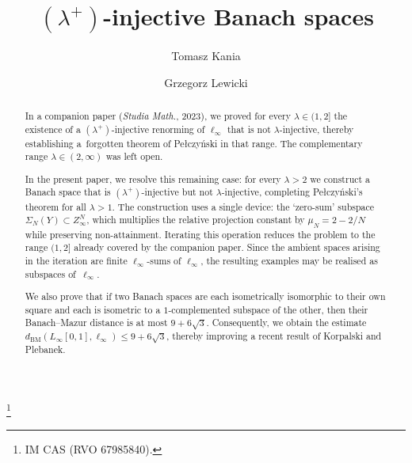 \documentclass[11pt]{amsart}
\renewcommand{\le}{\leqslant}
\theoremstyle{definition}
\theoremstyle{remark}
\theoremstyle{plain}
\numberwithin{equation}{section}
\newcommand{\BM}{\mathrm{BM}}
\newcommand{\dist}{d_{\BM}}
\begin{document}
\title[{$(\lambda^+)$-injective Banach spaces}]%
{$(\lambda^+)$-injective Banach spaces}

\author[T.~Kania]{Tomasz Kania}
\address[T.~Kania]{Mathematical Institute\\Czech Academy of Sciences\\%
\v{Z}itn\'a 25\\115~67 Praha 1\\Czech Republic
and Institute of Mathematics and Computer Science\\%
Jagiellonian University\\{\L}ojasiewicza 6, 30-348 Krak\'{o}w, Poland}
\thanks{IM CAS (RVO 67985840). }

\author[G.~Lewicki]{Grzegorz Lewicki}
\address[G.~Lewicki]{Institute of Mathematics and Computer Science\\%
Jagiellonian University\\{\L}ojasiewicza 6\\30-348 Krak\'{o}w, Poland}


\date{}

\begin{abstract}
In a companion paper (\emph{Studia Math.}, 2023), we proved for every
$\lambda\in(1,2]$ the existence of a $(\lambda^+)$-injective renorming
of $\ell_\infty$ that is not $\lambda$-injective, thereby establishing
a~forgotten theorem of Pe{\l}czy\'nski in that range.
The complementary range $\lambda\in(2,\infty)$ was left open.

In the present paper, we resolve this remaining case: for every
$\lambda>2$ we construct a Banach space that is
$(\lambda^+)$-injective but not $\lambda$-injective, completing
Pe{\l}czy\'nski's theorem for all $\lambda>1$.  The construction uses
a single device: the `zero-sum' subspace
$\Sigma_N(Y)\subset Z_\infty^N$,
which multiplies the relative projection constant by
$\mu_N=2-2/N$ while preserving non-attainment.  Iterating this
operation reduces the problem to the range $(1,2]$ already covered
by the companion paper.  Since the ambient spaces arising in the
iteration are finite $\ell_\infty$-sums of $\ell_\infty$, the
resulting examples may be realised as subspaces of~$\ell_\infty$.

We also prove that if two Banach spaces are each isometrically
isomorphic to their own square and each is isometric to a
$1$-complemented subspace of the other, then their Banach--Mazur
distance is at most $9+6\sqrt{3}$.  Consequently, we obtain the
estimate $\dist(L_\infty[0,1],\ell_\infty)\le 9+6\sqrt{3}$,
thereby improving a recent result of Korpalski and Plebanek.
\end{abstract}
\end{document}
